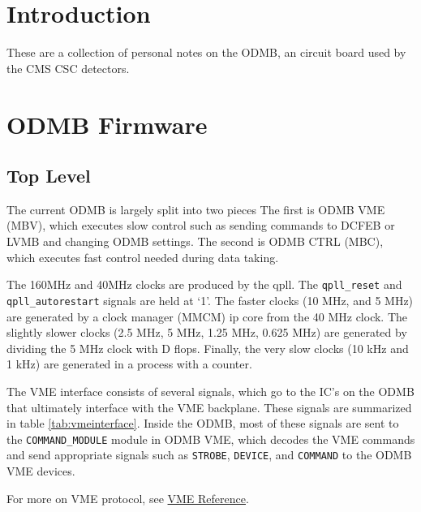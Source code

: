 \documentclass[10pt,a4paper]{article}
\begin{document}

\section{Introduction}

These are a collection of personal notes on the ODMB, an circuit board used by the CMS CSC detectors.

\section{ODMB Firmware}

\subsection{Top Level}

The current ODMB is largely split into two pieces The first is ODMB VME (MBV), which executes slow control such as sending commands to DCFEB or LVMB and changing ODMB settings. The second is ODMB CTRL (MBC), which executes fast control needed during data taking.

The 160MHz and 40MHz clocks are produced by the qpll. The \texttt{qpll\_reset} and \texttt{qpll\_autorestart} signals are held at `1'. The faster clocks (10 MHz, and 5 MHz) are generated by a clock manager (MMCM) ip core from the 40 MHz clock. The slightly slower clocks (2.5 MHz, 5 MHz, 1.25 MHz, 0.625 MHz) are generated by dividing the 5 MHz clock with D flops. Finally, the very slow clocks (10 kHz and 1 kHz) are generated in a process with a counter.

The VME interface consists of several signals, which go to the IC's on the ODMB that ultimately interface with the VME backplane. These signals are summarized in table \ref{tab:vmeinterface}. Inside the ODMB, most of these signals are sent to the \texttt{COMMAND\_MODULE} module in ODMB VME, which decodes the VME commands and send appropriate signals such as \texttt{STROBE}, \texttt{DEVICE}, and \texttt{COMMAND} to the ODMB VME devices. 

For more on VME protocol, see \href{http://www.interfacebus.com/Design_Connector_VME.html}{VME Reference}.
\end{document}
